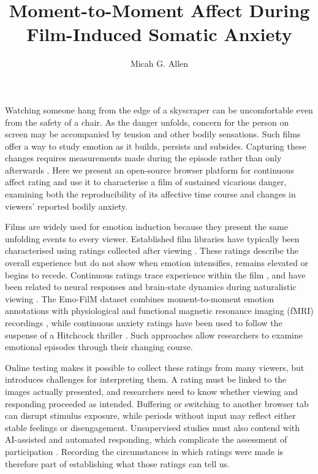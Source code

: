 \documentclass[man,12pt,british]{apa7}
\title{Moment-to-Moment Affect During Film-Induced Somatic Anxiety}
\author{Micah G. Allen}
\affiliation{Center of Functionally Integrative Neuroscience, Department of Clinical Medicine, Aarhus University,
Aarhus, Denmark}
\begin{document}
\linenumbers
\maketitle

Watching someone hang from the edge of a skyscraper can be uncomfortable even from the safety of a chair. As the
danger unfolds, concern for the person on screen may be accompanied by tension and other bodily sensations. Such films
offer a way to study emotion as it builds, persists and subsides. Capturing these changes requires measurements made
during the episode rather than only afterwards \parencite{saarimaki2021naturalistic}. Here we present an open-source
browser platform for continuous affect rating and use it to characterise a film of sustained vicarious danger,
examining both the reproducibility of its affective time course and changes in viewers' reported bodily anxiety.

Films are widely used for emotion induction because they present the same unfolding events to every viewer.
Established film libraries have typically been characterised using ratings collected after viewing
\parencite{gilman2017film,gross1995emotion,schaefer2010assessing}. These ratings describe the overall experience but
do not show when emotion intensifies, remains elevated or begins to recede. Continuous ratings trace experience within
the film \parencite{ruef2007continuous}, and have been related to neural responses and brain-state dynamics during
naturalistic viewing \parencite{chang2021endogenous,goldin2005neural}. The Emo-FilM dataset combines moment-to-moment
emotion annotations with physiological and functional magnetic resonance imaging (fMRI) recordings
\parencite{morgenroth2025emofilm}, while continuous anxiety ratings have been used to follow the suspense of a
Hitchcock thriller \parencite{kirk2024brainheart}. Such approaches allow researchers to examine emotional episodes
through their changing course.

Online testing makes it possible to collect these ratings from many viewers, but introduces challenges for
interpreting them. A rating must be linked to the images actually presented, and researchers need to know whether
viewing and responding proceeded as intended. Buffering or switching to another browser tab can disrupt stimulus
exposure, while periods without input may reflect either stable feelings or disengagement. Unsupervised studies must
also contend with AI-assisted and automated responding, which complicate the assessment of participation
\parencite{sehgal2026aiassisted,veselovsky2023artificial,westwood2025existential}. Recording the circumstances in
which ratings were made is therefore part of establishing what those ratings can tell us.
\end{document}
